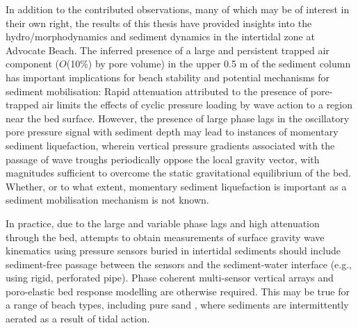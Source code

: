 In addition to the contributed observations, many of which may be of interest in their own right, the results of this thesis have provided insights into the hydro/morphodynamics and sediment dynamics in the intertidal zone at Advocate Beach. The inferred presence of a large and persistent trapped air component ($O$(10\%) by pore volume) in the upper 0.5 m of the sediment column has important implications for beach stability and potential mechanisms for sediment mobilisation: Rapid attenuation attributed to the presence of pore-trapped air limits the effects of cyclic pressure loading by wave action to a region near the bed surface. However, the presence of large phase lags in the oscillatory pore pressure signal with sediment depth may lead to instances of momentary sediment liquefaction, wherein vertical pressure gradients associated with the passage of wave troughs periodically oppose the local gravity vector, with magnitudes sufficient to overcome the static gravitational equilibrium of the bed. Whether, or to what extent, momentary sediment liquefaction is important as a sediment mobilisation mechanism is not known. 

In practice, due to the large and variable phase lags and high attenuation through the bed, attempts to obtain measurements of surface gravity wave kinematics using pressure sensors buried in intertidal sediments should include sediment-free passage between the sensors and the sediment-water interface (e.g., using rigid, perforated pipe). Phase coherent multi-sensor vertical arrays and poro-elastic bed response modelling are otherwise required. This may be true for a range of beach types, including pure sand \citep{Michallet_etal2009}, where sediments are intermittently aerated as a result of tidal action.




